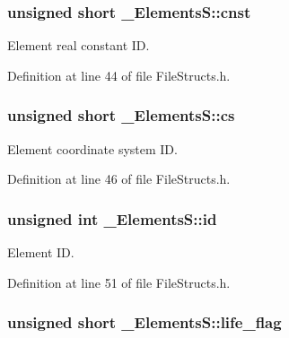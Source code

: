 \subsubsection[{\texorpdfstring{cnst}{cnst}}]{\setlength{\rightskip}{0pt plus 5cm}unsigned short \+\_\+\+Elements\+S\+::cnst}\hypertarget{struct___elements_s_ad11820e13b8992fd7465e5a3c4201e84}{}\label{struct___elements_s_ad11820e13b8992fd7465e5a3c4201e84}


Element real constant ID. 



Definition at line 44 of file File\+Structs.\+h.

\subsubsection[{\texorpdfstring{cs}{cs}}]{\setlength{\rightskip}{0pt plus 5cm}unsigned short \+\_\+\+Elements\+S\+::cs}\hypertarget{struct___elements_s_a59e50bef826fc636e452a480e42bb082}{}\label{struct___elements_s_a59e50bef826fc636e452a480e42bb082}


Element coordinate system ID. 



Definition at line 46 of file File\+Structs.\+h.

\subsubsection[{\texorpdfstring{id}{id}}]{\setlength{\rightskip}{0pt plus 5cm}unsigned int \+\_\+\+Elements\+S\+::id}\hypertarget{struct___elements_s_a782d0149d17748d22630799112b10680}{}\label{struct___elements_s_a782d0149d17748d22630799112b10680}


Element ID. 



Definition at line 51 of file File\+Structs.\+h.

\subsubsection[{\texorpdfstring{life\+\_\+flag}{life_flag}}]{\setlength{\rightskip}{0pt plus 5cm}unsigned short \+\_\+\+Elements\+S\+::life\+\_\+flag}\hypertarget{struct___elements_s_a966797bc046fea5472386a7a67867376}{}\label{struct___elements_s_a966797bc046fea5472386a7a67867376}


